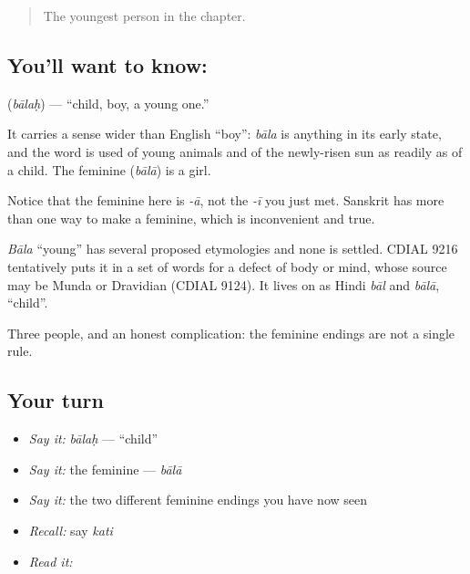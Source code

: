 \label{lesson:SA-C20-child}



\begin{quote}
The youngest person in the chapter.
\end{quote}

\subsection*{You'll want to know: }
\textbf{} (\emph{bālaḥ}) — \textquotedblleft{}child, boy, a young one.\textquotedblright{}

It carries a sense wider than English \textquotedblleft{}boy\textquotedblright{}: \emph{bāla} is anything in its early state, and the word is used of young animals and of the newly-risen sun as readily as of a child. The feminine \textbf{} (\emph{bālā}) is a girl.

Notice that the feminine here is \emph{-ā}, not the \emph{-ī} you just met. Sanskrit has more than one way to make a feminine, which is inconvenient and true.

\begin{cousinweb}
\emph{Bāla} \textquotedblleft{}young\textquotedblright{} has several proposed etymologies and none is settled. CDIAL 9216 tentatively puts it in a set of words for a defect of body or mind, whose source may be Munda or Dravidian (CDIAL 9124). It lives on as Hindi \emph{bāl} and \emph{bālā}, \textquotedblleft{}child\textquotedblright{}.
\end{cousinweb}

\begin{grammarlens}[title={What you've built}]
Three people, and an honest complication: the feminine endings are not a single rule.
\end{grammarlens}

\subsection*{Your turn}
\begin{itemize}
\raggedright
  \item \emph{Say it:} \emph{bālaḥ} — \textquotedblleft{}child\textquotedblright{}
  \item \emph{Say it:} the feminine — \emph{bālā}
  \item \emph{Say it:} the two different feminine endings you have now seen
  \item \emph{Recall:} say \emph{kati}
  \item \emph{Read it:} \textbf{}
\end{itemize}


